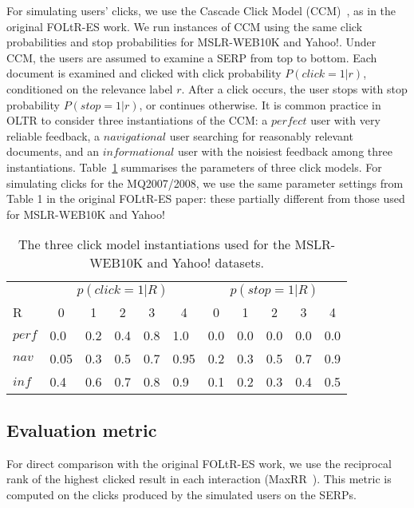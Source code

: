 For simulating users' clicks, we use the Cascade Click Model (CCM)~\cite{DBLP:conf/wsdm/GuoLW09}, as in the original FOLtR-ES work. We run instances of CCM using the same click probabilities and stop probabilities for MSLR-WEB10K and Yahoo!. Under CCM, the users are assumed to examine a SERP from top to bottom. Each document is examined and clicked with click probability $P(click = 1 | r)$, conditioned on the relevance label $r$. After a click occurs, the user stops with stop probability $P(stop = 1 | r)$, or continues otherwise. It is common practice in OLTR to consider three instantiations of the CCM: a $perfect$ user with very reliable feedback, a $navigational$ user searching for reasonably relevant documents, and an $informational$ user with the noisiest feedback among three instantiations.  Table~\ref{mslr-CCM} summarises the parameters of three click models. For simulating clicks for the MQ2007/2008, we use the same parameter settings from Table 1 in the original FOLtR-ES paper: these partially different from those used for MSLR-WEB10K and Yahoo! {\color{red}{because relevance labels in these datasets are five-graded, while they are three-graded in MQ2007/2008.}}

\newcommand{\tc}[1]{\multicolumn{1}{c}{#1}}
\setlength{\tabcolsep}{3mm}

\begin{table}[t!]
	\centering
	\caption[centre]{The three click model instantiations used for the MSLR-WEB10K and Yahoo! datasets.}\label{mslr-CCM}
	\begin{tabularx}{\textwidth}{XXXXXXXXXXX}
		\toprule
		& \multicolumn{5}{c}{$p(click=1|R)$} & \multicolumn{5}{c}{$p(stop=1|R)$} \\
		\cmidrule(r){2-6}  \cmidrule(){7-11}
		R & \tc{0}& \tc{1} &\tc{2} & \tc{3}& \tc{4}&  \tc{0} & \tc{1} & \tc{2} & \tc{3} & \tc{4} \\
		\midrule
		$perf$ & 0.0 & 0.2 & 0.4 & 0.8 & 1.0& 0.0 & 0.0 & 0.0 & 0.0 & 0.0\\
		$nav$ & 0.05 & 0.3 & 0.5 & 0.7 & 0.95& 0.2 & 0.3 & 0.5 & 0.7 & 0.9\\
		$inf$ & 0.4 & 0.6 & 0.7 & 0.8 & 0.9& 0.1 & 0.2 & 0.3 & 0.4 & 0.5\\
		\bottomrule
	\end{tabularx}
	\vspace{-10pt}
\end{table}

\subsection{Evaluation metric}
For direct comparison with the original FOLtR-ES work, we use the reciprocal rank of the highest clicked result in each interaction (MaxRR~\cite{radlinski2008learning}). This metric is computed on the clicks produced by the simulated users on the SERPs. 

